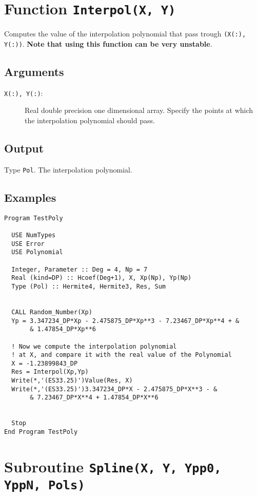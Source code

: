 \section{Function \texttt{Interpol(X, Y)}}

Computes the value of the interpolation polynomial that pass trough
\texttt{(X(:), Y(:))}. \textbf{Note that using this function can be
very unstable}.

\subsection{Arguments}

\begin{description}
\item[\texttt{X(:), Y(:)}:] Real double precision one dimensional
  array. Specify the points at which the interpolation polynomial
  should pass. 
\end{description}

\subsection{Output}

Type \texttt{Pol}. The interpolation polynomial.

\subsection{Examples}

\begin{verbatim}
Program TestPoly

  USE NumTypes
  USE Error
  USE Polynomial

  Integer, Parameter :: Deg = 4, Np = 7
  Real (kind=DP) :: Hcoef(Deg+1), X, Xp(Np), Yp(Np)
  Type (Pol) :: Hermite4, Hermite3, Res, Sum


  CALL Random_Number(Xp)
  Yp = 3.347234_DP*Xp - 2.475875_DP*Xp**3 - 7.23467_DP*Xp**4 + &
       & 1.47854_DP*Xp**6

  ! Now we compute the interpolation polynomial
  ! at X, and compare it with the real value of the Polynomial
  X = -1.23899843_DP
  Res = Interpol(Xp,Yp)
  Write(*,'(ES33.25)')Value(Res, X)
  Write(*,'(ES33.25)')3.347234_DP*X - 2.475875_DP*X**3 - &
       & 7.23467_DP*X**4 + 1.47854_DP*X**6


  Stop
End Program TestPoly
\end{verbatim}

\section{Subroutine \texttt{Spline(X, Y, Ypp0, YppN, Pols)}}

